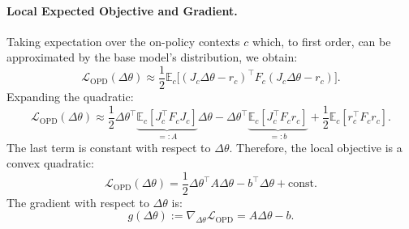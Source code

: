 \documentclass{article}
\begin{document}
\paragraph{Local Expected Objective and Gradient.}
Taking expectation over the on-policy contexts \(c\) which, to first order, can be approximated by the base model's distribution, we obtain:
\begin{equation}
\mathcal{L}_{\mathrm{OPD}}(\Delta\theta) \approx \frac{1}{2} \mathbb{E}_{c}\big[ (J_c\Delta\theta - r_c)^{\top} F_c (J_c\Delta\theta - r_c) \big].
\end{equation}
Expanding the quadratic:
\begin{equation}
\mathcal{L}_{\mathrm{OPD}}(\Delta\theta) \approx 
\frac{1}{2} \Delta\theta^{\top} \underbrace{\mathbb{E}_c[J_c^{\top} F_c J_c]}_{=: A} \Delta\theta
- \Delta\theta^{\top} \underbrace{\mathbb{E}_c[J_c^{\top} F_c r_c]}_{=: b}
+ \frac{1}{2} \mathbb{E}_c[r_c^{\top} F_c r_c].
\end{equation}
The last term is constant with respect to \(\Delta\theta\). Therefore, the local objective is a convex quadratic:
\begin{equation}
\mathcal{L}_{\mathrm{OPD}}(\Delta\theta) = \frac{1}{2} \Delta\theta^{\top} A \Delta\theta - b^{\top} \Delta\theta + \text{const}.
\end{equation}
The gradient with respect to \(\Delta\theta\) is:
\begin{equation}
g(\Delta\theta) := \nabla_{\Delta\theta} \mathcal{L}_{\mathrm{OPD}} = A \Delta\theta - b.
\end{equation}
\end{document}
